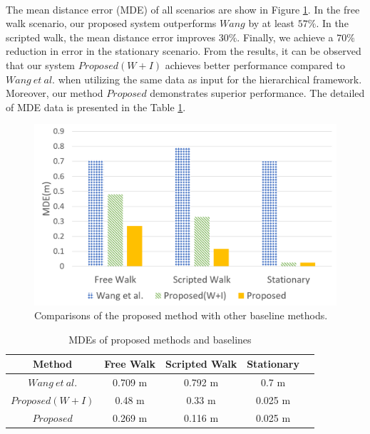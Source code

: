 \documentclass[a4paper,12pt]{report}
\begin{document}
\paragraph{}
The mean distance error (MDE) of all scenarios are show in Figure \ref{Fig:mde_baseline}. In the free walk scenario, our proposed system outperforms $Wang$ by at least $57\%$. In the scripted walk, the mean distance error improves $30\%$. Finally, we achieve a $70\%$ reduction in error in the stationary scenario. From the results, it can be observed that our system $Proposed(W+I)$ achieves better performance compared to $Wang\ et\ al.$ when utilizing the same data as input for the hierarchical framework. Moreover, our method $Proposed$ demonstrates superior performance. The detailed of MDE data is presented in the Table \ref{table:5_1_MDEs}.
\begin{figure}[h]
    \centering
    \includegraphics[width=0.8\columnwidth]{images/chap5-1/MDE_5-1.png}
    \caption{Comparisons of the proposed method with other baseline methods.}
    \label{Fig:mde_baseline}
\end{figure}
\begin{table}
    \begin{center}
    \caption{MDEs of proposed methods and baselines}
    \label{table:5_1_MDEs}
        \begin{tabular}{|c||c|c|c|c|}
            \hline
                Method & Free Walk & Scripted Walk & Stationary \\
            \hline
            \hline
                $Wang\ et\ al.$ & 0.709 m  & 0.792 m  & 0.7 m \\
            \hline
                $Proposed(W+I)$   & 0.48 m  & 0.33 m  & 0.025 m \\
            \hline
                $Proposed$   & 0.269 m & 0.116 m & 0.025 m \\
            \hline
        \end{tabular}
    \end{center}
\end{table}
\end{document}

